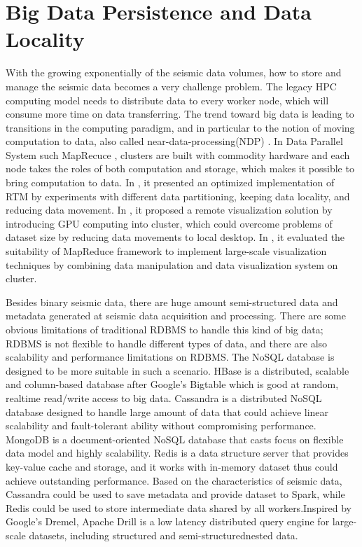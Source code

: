 \section{Big Data Persistence and Data Locality}
With the growing exponentially of the seismic data volumes, how to store and manage the seismic data becomes a very challenge problem. The legacy HPC computing model needs to distribute data to every worker node, which will consume more time on data transferring. The trend toward big data is leading to transitions in the computing paradigm, and in particular to the notion of moving computation to data, also called near-data-processing(NDP) \cite{6871738BalasubramonianNDP}. In Data Parallel System such MapRecuce \cite{6217449GuoDataLocalityMapReduce}, clusters are built with commodity hardware and each node takes the roles of both computation and storage, which makes it possible to bring computation to data. In \cite{6267846PerroneReducingDataMovement}, it presented an optimized implementation of RTM by experiments with different data partitioning, keeping data locality, and reducing data movement. In \cite{NextDataCenterVisualization}, it proposed a remote visualization solution by introducing GPU computing into cluster, which could overcome problems of dataset size by reducing data movements to local desktop. In \cite{6092321VoParaVisMapReduce}, it evaluated the suitability of MapReduce framework to implement large-scale visualization techniques by combining data manipulation and data visualization system on cluster. 

Besides  binary seismic data, there are huge amount semi-structured data and metadata generated at seismic data acquisition and processing. There are some obvious limitations of traditional RDBMS to handle this kind of big data; RDBMS is not flexible to handle different types of data, and there are also scalability and performance limitations on RDBMS. The NoSQL database is designed to be more suitable in such a scenario. HBase \cite{ApacheHBase} is a distributed, scalable and column-based database after Google's Bigtable \cite{BigTableChang1365816} which is good at random, realtime read/write access to big data. Cassandra \cite{ApacheCassandra} is a distributed NoSQL database designed to handle large amount of data that could achieve linear scalability and fault-tolerant ability without compromising performance. MongoDB \cite{MongoDBNoSQL} is a document-oriented NoSQL database that casts focus on flexible data model and highly scalability. Redis \cite{RedisNoSQL} is a data structure server that provides key-value cache and storage, and it works with in-memory dataset thus could achieve outstanding performance. Based on the characteristics of seismic data, Cassandra could be used to save metadata and provide dataset to Spark, while Redis could be used to store intermediate data shared by all workers.Inspired by Google’s Dremel, Apache Drill \cite{ApacheDrillMain} is a low latency distributed query engine for large-scale datasets, including structured and semi-structured\/nested data. 

